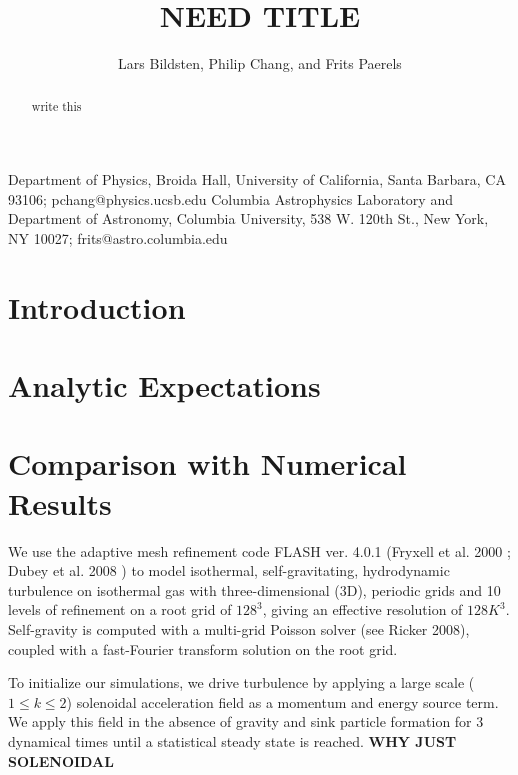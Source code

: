 \documentclass{emulateapj}
\begin{document}
\title{NEED TITLE}

\author{Lars Bildsten, Philip Chang,
and Frits Paerels}
{Department of Physics, Broida Hall, University of California,
Santa Barbara, CA 93106; pchang@physics.ucsb.edu}
{Columbia Astrophysics Laboratory and Department of Astronomy,
Columbia University, 538 W. 120th St., New York, NY 10027;
frits@astro.columbia.edu}


\begin{abstract}

write this

\end{abstract}


\section{Introduction}

\section{Analytic Expectations}
\section{Comparison with Numerical Results}

We use the adaptive mesh refinement code FLASH ver. 4.0.1 (Fryxell et al.
2000
; Dubey
et al.
2008
) to model isothermal, self-gravitating, hydrodynamic turbulence on isothermal gas with three-dimensional (3D),
periodic grids and 10 levels of refinement on a root grid of $128^3$, giving an effective resolution of $128K^3$.  
Self-gravity is computed with a multi-grid Poisson solver (see Ricker
2008), coupled with a fast-Fourier transform solution on the root grid.

To initialize our simulations, we drive turbulence by applying a large scale ($1 \le k \le 2$) solenoidal 
acceleration field as a momentum and energy source term.  We apply this field in the absence of gravity and sink particle formation for 3 dynamical times until a statistical steady state is reached.
{\bf WHY JUST SOLENOIDAL}
\end{document}
